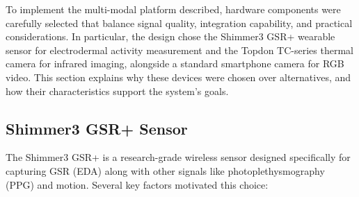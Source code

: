 \documentclass{report}
\begin{document}
    To implement the multi-modal platform described, hardware components were carefully selected that balance signal quality, integration capability, and practical considerations. In particular, the design chose the Shimmer3 GSR+ wearable sensor for electrodermal activity measurement and the Topdon TC-series thermal camera for infrared imaging, alongside a standard smartphone camera for RGB video. This section explains why these devices were chosen over alternatives, and how their characteristics support the system's goals.

    \subsection*{Shimmer3 GSR+ Sensor}
    The Shimmer3 GSR+ is a research-grade wireless sensor designed specifically for capturing GSR (EDA) along with other signals like photoplethysmography (PPG) and motion. Several key factors motivated this choice:
\end{document}
